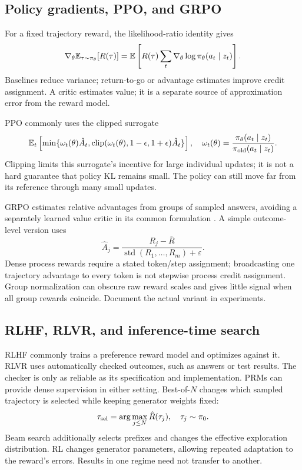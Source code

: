 \subsection{Policy gradients, PPO, and GRPO}
For a fixed trajectory reward, the likelihood-ratio identity gives
\[
 \nabla_\theta\mathbb{E}_{\tau\sim\pi_\theta}[R(\tau)]
 =\mathbb{E}\left[R(\tau)\sum_t\nabla_\theta\log\pi_\theta(a_t\mid z_t)\right].
\]
Baselines reduce variance; return-to-go or advantage estimates improve credit
assignment. A critic estimates value; it is a separate source of approximation
error from the reward model.

PPO commonly uses the clipped surrogate \cite{ppo}
\[
 \mathbb{E}_t\left[\min\{\omega_t(\theta)\hat A_t,
 \operatorname{clip}(\omega_t(\theta),1-\epsilon,1+\epsilon)\hat A_t\}\right],
 \quad \omega_t(\theta)=\frac{\pi_\theta(a_t\mid z_t)}{\pi_{\rm old}(a_t\mid z_t)}.
\]
Clipping limits this surrogate's incentive for large individual updates; it is
not a hard guarantee that policy KL remains small. The policy can still move
far from its reference through many small updates.

GRPO estimates relative advantages from groups of sampled answers, avoiding a
separately learned value critic in its common formulation \cite{deepseekmath}.
A simple outcome-level version uses
\[
 \hat A_j=\frac{R_j-\bar R}{\operatorname{std}(R_1,\ldots,R_m)+\varepsilon}.
\]
Dense process rewards require a stated token/step assignment; broadcasting one
trajectory advantage to every token is not stepwise process credit assignment.
Group normalization can obscure raw reward scales and gives little signal when
all group rewards coincide. Document the actual variant in experiments.

\subsection{RLHF, RLVR, and inference-time search}
RLHF commonly trains a preference reward model and optimizes against it. RLVR
uses automatically checked outcomes, such as answers or test results. The
checker is only as reliable as its specification and implementation. PRMs can
provide dense supervision in either setting. Best-of-$N$ changes which sampled
trajectory is selected while keeping generator weights fixed:
\[
 \tau_{\rm sel}=\arg\max_{j\le N}\hat R(\tau_j),\quad \tau_j\sim\pi_0.
\]
Beam search additionally selects prefixes and changes the effective exploration
distribution. RL changes generator parameters, allowing repeated adaptation to
the reward's errors. Results in one regime need not transfer to another.

